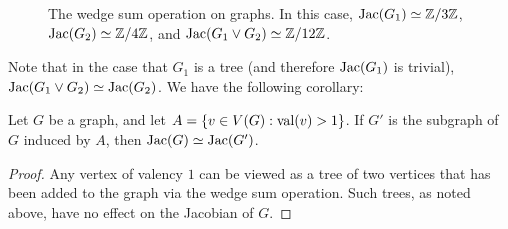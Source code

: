 \documentclass{amsart}
\begin{document}
\begin{figure}[h]
  \caption{The wedge sum operation on graphs. In this case, $\operatorname{Jac}(G_1)
  \simeq \mathbb{Z}/3\mathbb{Z}$, $\operatorname{Jac}(G_2) \simeq \mathbb{Z}/4\mathbb{Z}$, and $\operatorname{Jac}(G_1 \vee G_2)
  \simeq \mathbb{Z}/12\mathbb{Z}$.}
\end{figure}

Note that in the case that $G_1$ is a tree (and therefore $\operatorname{Jac}(G_1)$
is trivial), $\operatorname{Jac}(G_1 \vee G_2) \simeq \operatorname{Jac}(G_2)$. We have the
following corollary:
\begin{cor}
  \label{cor:1_valent}
  Let $G$ be a graph, and let $A = \{v \in V(G) : \operatorname{val}(v) > 1\}$. If
  $G'$ is the subgraph of $G$ induced by $A$, then $\operatorname{Jac}(G) \simeq
  \operatorname{Jac}(G')$.
\end{cor}

\begin{proof}
  Any vertex of valency $1$ can be viewed as a tree of two vertices
  that has been added to the graph via the wedge sum operation. Such
  trees, as noted above, have no effect on the Jacobian of $G$.
\end{proof}
\end{document}
